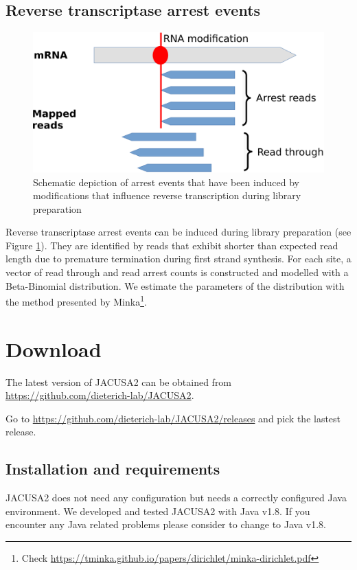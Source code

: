 \documentclass[10pt,a4paper]{article} \usepackage[utf8]{inputenc}
\begin{document}
\subsection{Reverse transcriptase arrest events}
\begin{figure}[ht]
  \centering
  \includegraphics[width=.6\textwidth]{figures/arrest_events_cropped}
  \caption{Schematic depiction of arrest events that have been induced by modifications that
  influence reverse transcription during library preparation}
  \label{fig:arrest_event}
\end{figure}
Reverse transcriptase arrest events can be induced during library preparation (see Figure
\ref{fig:arrest_event}).
They are identified by reads that exhibit shorter than expected read length due to premature
termination during first strand synthesis. For each site, a vector of read through and read arrest
counts is constructed and modelled with a Beta-Binomial distribution. We estimate the parameters of
the distribution with the method presented by Minka\footnote{Check 
\url{https://tminka.github.io/papers/dirichlet/minka-dirichlet.pdf}}.
\section{Download}
The latest version of JACUSA2 can be obtained from
\url{https://github.com/dieterich-lab/JACUSA2}.

Go to \url{https://github.com/dieterich-lab/JACUSA2/releases} and pick the lastest
release.
\subsection{Installation and requirements}
JACUSA2 does not need any configuration but needs a correctly configured Java environment.
We developed and tested JACUSA2 with Java v1.8. If you encounter any Java related problems please
consider to change to Java v1.8.
\end{document}
